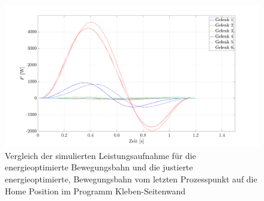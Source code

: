\begin{figure}[tbph]
	\centering
	\includegraphics[width=1\linewidth]{images/Optimierungsergebnisse_up/poptfinal}
	\caption{Vergleich der simulierten Leistungsaufnahme für die energieoptimierte Bewegungsbahn und die justierte energieoptimierte, Bewegungsbahn vom letzten Prozesspunkt auf die  Home Position im Programm Kleben-Seitenwand}
	\label{fig:poptfinal}
\end{figure}
